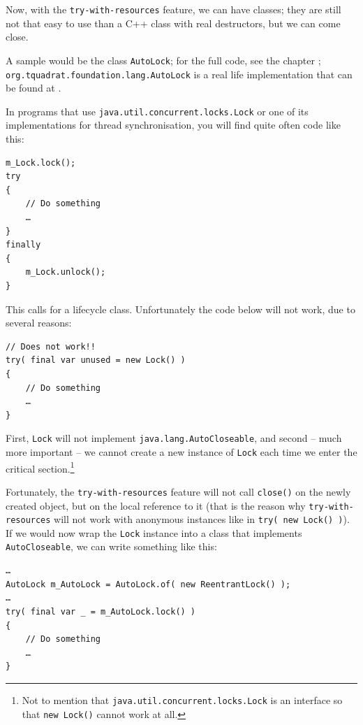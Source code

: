 Now, with the \verb#try-with-resources# feature, we can have  classes; they are still not that easy to use than a C++ class with real destructors, but we can come close.

A sample would be the class \lstinline|AutoLock|; for the full code, see the chapter ; \lstinline|org.tquadrat.foundation.lang.AutoLock| is a real life implementation that can be found at \autocite{TQUADRAT_ORG_FOUNDATION_AUTOLOCK}.

In programs that use \lstinline|java.util.concurrent.locks.Lock|\autocite{ORACLE_DOC_LOCK_INTERFACE} or one of its implementations for thread synchronisation, you will find quite often code like this:
\begin{lstlisting}
m_Lock.lock();
try
{
    // Do something
    …
}
finally 
{ 
    m_Lock.unlock(); 
}
\end{lstlisting}

This calls for a lifecycle class. Unfortunately the code below will not work, due to several reasons:
\begin{lstlisting}
// Does not work!!
try( final var unused = new Lock() )
{
    // Do something
    …
}
\end{lstlisting}

First, \lstinline|Lock| will not implement \lstinline|java.lang.AutoCloseable|, and second – much more important – we cannot create a new instance of \lstinline|Lock| each time we enter the critical section.\footnote{Not to mention that \lstinline|java.util.concurrent.locks.Lock| is an interface so that \lstinline|new Lock()| cannot work at all.}

Fortunately, the \verb#try-with-resources# feature will not call \lstinline|close()| on the newly created object, but on the local reference to it (that is the reason why \verb#try-with-resources# will not work with anonymous instances like in \lstinline|try( new Lock() )|). If we would now wrap the \lstinline|Lock| instance into a class that implements \lstinline|AutoCloseable|, we can write something like this:
\begin{lstlisting}
…
AutoLock m_AutoLock = AutoLock.of( new ReentrantLock() );
…
try( final var _ = m_AutoLock.lock() )
{
    // Do something
    …
}
\end{lstlisting}

